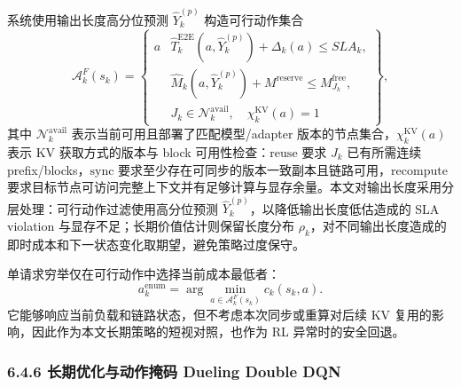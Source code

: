 系统使用输出长度高分位预测 \(\widehat Y_k^{(p)}\) 构造可行动作集合
\[
\mathcal A_k^F(s_k)
=
\left\{
\begin{array}{l|l}
a &
\widehat T_k^{\mathrm{E2E}}(a,\widehat Y_k^{(p)})
+\Delta_k(a)\le SLA_k,\\
& \widehat M_k(a,\widehat Y_k^{(p)})+M^{\mathrm{reserve}}
\le M_{J_k}^{\mathrm{free}},\\
& J_k\in\mathcal N_k^{\mathrm{avail}},\quad
\chi_k^{\mathrm{KV}}(a)=1
\end{array}
\right\},
\]
其中 \(\mathcal N_k^{\mathrm{avail}}\) 表示当前可用且部署了匹配模型/adapter 版本的节点集合，\(\chi_k^{\mathrm{KV}}(a)\) 表示 KV 获取方式的版本与 block 可用性检查：\(\mathrm{reuse}\) 要求 \(J_k\) 已有所需连续 prefix/blocks，\(\mathrm{sync}\) 要求至少存在可同步的版本一致副本且链路可用，\(\mathrm{recompute}\) 要求目标节点可访问完整上下文并有足够计算与显存余量。本文对输出长度采用分层处理：可行动作过滤使用高分位预测 \(\widehat Y_k^{(p)}\)，以降低输出长度低估造成的 SLA violation 与显存不足；长期价值估计则保留长度分布 \(\rho_k\)，对不同输出长度造成的即时成本和下一状态变化取期望，避免策略过度保守。

单请求穷举仅在可行动作中选择当前成本最低者：
\[
a_k^{\mathrm{enum}}
=
\arg\min_{a\in\mathcal A_k^F(s_k)}c_k(s_k,a).
\]
它能够响应当前负载和链路状态，但不考虑本次同步或重算对后续 KV 复用的影响，因此作为本文长期策略的短视对照，也作为 RL 异常时的安全回退。

\subsubsection*{6.4.6 长期优化与动作掩码 Dueling Double DQN}

